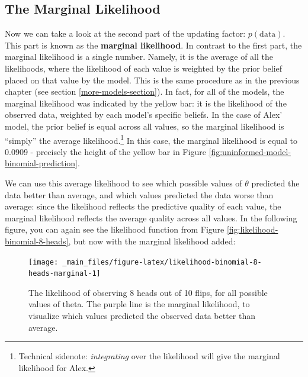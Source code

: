 \documentclass[
]{book}
\begin{document}
\hypertarget{the-marginal-likelihood}{%
\subsection{The Marginal Likelihood}\label{the-marginal-likelihood}}

Now we can take a look at the second part of the updating factor: \(p( \text{data})\). This part is known as the \textbf{marginal likelihood}. In contrast to the first part, the marginal likelihood is a single number. Namely, it is the average of all the likelihoods, where the likelihood of each value is weighted by the prior belief placed on that value by the model. This is the same procedure as in the previous chapter (see section \ref{more-models-section}). In fact, for all of the models, the marginal likelihood was indicated by the yellow bar: it is the likelihood of the observed data, weighted by each model's specific beliefs.
In the case of Alex' model, the prior belief is equal across all values, so the marginal likelihood is ``simply'' the average likelihood.\footnote{Technical sidenote: \emph{integrating} over the likelihood will give the marginal likelihood for Alex.} In this case, the marginal likelihood is equal to 0.0909 - precisely the height of the yellow bar in Figure \ref{fig:uninformed-model-binomial-prediction}.

We can use this average likelihood to see which possible values of \(\theta\) predicted the data better than average, and which values predicted the data worse than average: since the likelihood reflects the predictive quality of each value, the marginal likelihood reflects the average quality across all values.
In the following figure, you can again see the likelihood function from Figure \ref{fig:likelihood-binomial-8-heads}, but now with the marginal likelihood added:

\begin{figure}

{\centering \texttt{[image: \_main\_files/figure-latex/likelihood-binomial-8-heads-marginal-1]} 

}

\caption{The likelihood of observing 8 heads out of 10 flips, for all possible values of theta. The purple line is the marginal likelihood, to visualize which values predicted the observed data better than average.}\label{fig:likelihood-binomial-8-heads-marginal}
\end{figure}
\end{document}
